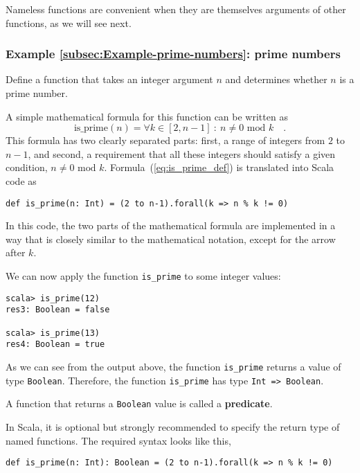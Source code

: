 Nameless functions are convenient when they are themselves arguments
of other functions, as we will see next.

\subsubsection{Example \label{subsec:Example-prime-numbers}\ref{subsec:Example-prime-numbers}:
prime numbers}

Define a function that takes an integer argument $n$ and determines
whether $n$ is a prime number.

A simple mathematical formula for this function can be written as
\begin{equation}
\text{is\_prime}\left(n\right)=\forall k\in\left[2,n-1\right]\ :\ n\neq0\text{ mod }k\quad.\label{eq:is_prime_def}
\end{equation}
This formula has two clearly separated parts: first, a range of integers
from $2$ to $n-1$, and second, a requirement that all these integers
should satisfy a given condition, $n\neq0\text{ mod }k$. Formula~(\ref{eq:is_prime_def})
is translated into Scala code as
\begin{lstlisting}
def is_prime(n: Int) = (2 to n-1).forall(k => n % k != 0)
\end{lstlisting}
In this code, the two parts of the mathematical formula are implemented
in a way that is closely similar to the mathematical notation, except
for the arrow after $k$.

We can now apply the function \lstinline!is_prime! to some integer
values:
\begin{lstlisting}
scala> is_prime(12)
res3: Boolean = false

scala> is_prime(13)
res4: Boolean = true
\end{lstlisting}
As we can see from the output above, the function \lstinline!is_prime!
returns a value of type \lstinline!Boolean!. Therefore, the function
\lstinline!is_prime! has type \lstinline!Int => Boolean!.

A function that returns a \lstinline!Boolean! value is called a \textbf{predicate}.

In Scala, it is optional \textendash{} but strongly recommended \textendash{}
to specify the return type of named functions. The required syntax
looks like this,
\begin{lstlisting}
def is_prime(n: Int): Boolean = (2 to n-1).forall(k => n % k != 0)
\end{lstlisting}

